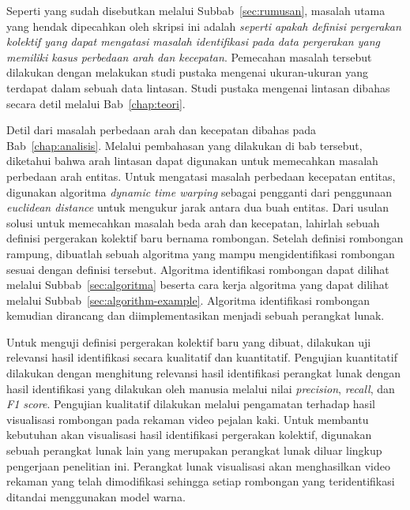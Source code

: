 Seperti yang sudah disebutkan melalui Subbab~\ref{sec:rumusan}, masalah utama yang hendak dipecahkan oleh skripsi ini adalah \textit{seperti apakah definisi pergerakan kolektif yang dapat mengatasi masalah identifikasi pada data pergerakan yang memiliki kasus perbedaan arah dan kecepatan}. Pemecahan masalah tersebut dilakukan dengan melakukan studi pustaka mengenai ukuran-ukuran yang terdapat dalam sebuah data lintasan. Studi pustaka mengenai lintasan dibahas secara detil melalui Bab~\ref{chap:teori}.

Detil dari masalah perbedaan arah dan kecepatan dibahas pada Bab~\ref{chap:analisis}. Melalui pembahasan yang dilakukan di bab tersebut, diketahui bahwa arah lintasan dapat digunakan untuk memecahkan masalah perbedaan arah entitas. Untuk mengatasi masalah perbedaan kecepatan entitas, digunakan algoritma \textit{dynamic time warping} sebagai pengganti dari penggunaan \textit{euclidean distance} untuk mengukur jarak antara dua buah entitas. Dari usulan solusi untuk memecahkan masalah beda arah dan kecepatan, lahirlah sebuah definisi pergerakan kolektif baru bernama rombongan. Setelah definisi rombongan rampung, dibuatlah sebuah algoritma yang mampu mengidentifikasi rombongan sesuai dengan definisi tersebut. Algoritma identifikasi rombongan dapat dilihat melalui Subbab~\ref{sec:algoritma} beserta cara kerja algoritma yang dapat dilihat melalui Subbab~\ref{sec:algorithm-example}. Algoritma identifikasi rombongan kemudian dirancang dan diimplementasikan menjadi sebuah perangkat lunak.

Untuk menguji definisi pergerakan kolektif baru yang dibuat, dilakukan uji relevansi hasil identifikasi secara kualitatif dan kuantitatif. Pengujian kuantitatif dilakukan dengan menghitung relevansi hasil identifikasi perangkat lunak dengan hasil identifikasi yang dilakukan oleh manusia melalui nilai \textit{precision}, \textit{recall}, dan \textit{F1 score}. Pengujian kualitatif dilakukan melalui pengamatan terhadap hasil visualisasi rombongan pada rekaman video pejalan kaki. Untuk membantu kebutuhan akan visualisasi hasil identifikasi pergerakan kolektif, digunakan sebuah perangkat lunak lain yang merupakan perangkat lunak diluar lingkup pengerjaan penelitian ini. Perangkat lunak visualisasi akan menghasilkan video rekaman yang telah dimodifikasi sehingga setiap rombongan yang teridentifikasi ditandai menggunakan model warna.

